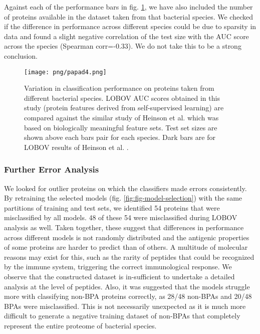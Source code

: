 \documentclass[10pt,journal,compsoc,twoside]{IEEEtran}
\begin{document}
Against each of the performance bars in fig. \ref{fig:fig-lobov}, we have also included the number of proteins available in the dataset taken from that bacterial species. We checked if the difference in performance across different species could be due to sparsity in data and found a slight negative correlation of the test size with the AUC score across the species (Spearman corr=-0.33). We do not take this to be a strong conclusion.

\begin{figure}[!t]
\centering
\texttt{[image: png/papad4.png]}
\caption{Variation in classification performance on proteins taken from different bacterial species. LOBOV AUC scores obtained in this study (protein features derived from self-supervised learning) are compared against the similar study of Heinson et al. \cite{heinson_2019} which was based on biologically meaningful feature sets. Test set sizes are shown above each bars pair for each species. Dark bars are for LOBOV results of Heinson et al. \cite{heinson_2019}.}
\label{fig:fig-lobov}
\end{figure}

\subsubsection{Further Error Analysis}
\label{sec:lobov}

We looked for outlier proteins on which the classifiers made errors consistently. By retraining the selected models (fig. \ref{fig:fig-model-selection}) with the same partitions of training and test sets, we identified 54 proteins that were misclassified by all models. 48 of these 54 were misclassified during LOBOV analysis as well. Taken together, these suggest that differences in performance across different models is not randomly distributed and the antigenic properties of some proteins are harder to predict than of others. A multitude of molecular reasons may exist for this, such as the rarity of peptides that could be recognized by the immune system, triggering the correct immunological response. We observe that the constructed dataset is in-sufficient to undertake a detailed analysis at the level of peptides. Also, it was suggested that the models struggle more with classifying non-BPA proteins correctly, as 28/48 non-BPAs and 20/48 BPAs were misclassified. This is not necessarily unexpected as it is much more difficult to generate a negative training dataset of non-BPAs that completely represent the entire proteome of bacterial species. 
\end{document}
